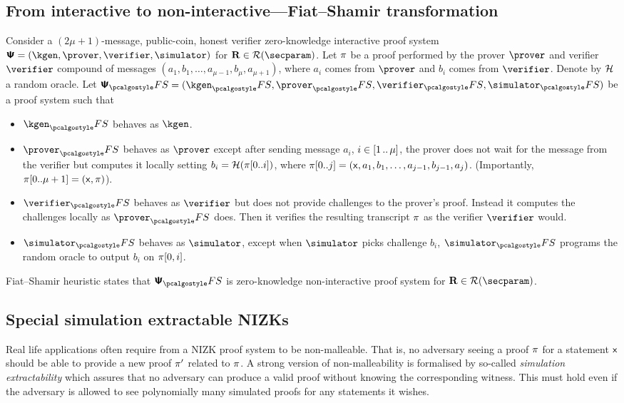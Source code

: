 \documentclass[runningheads,11pt]{llncs}
\begin{document}
\subsection{From interactive to non-interactive---Fiat--Shamir transformation}
Consider a $(2\mu + 1)$-message, public-coin, honest verifier zero-knowledge
interactive proof system
$\proofsystem = (\kgen, \prover, \verifier, \simulator)$ for
$\REL \in \RELGEN(\secparam)$.  Let $\pi$ be a proof performed by the
prover $\prover$ and verifier $\verifier$ compound of messages
$(a_1, b_1, \ldots, a_{\mu - 1}, b_{\mu}, a_{\mu + 1})$, where $a_i$ comes from
$\prover$ and $b_i$ comes from $\verifier$.  Denote by $\mathcal{H}$ a random oracle.
Let $\proofsystem_\fs = (\kgen_\fs, \prover_\fs, \verifier_\fs, \simulator_\fs)$
be a proof system such that
\begin{itemize}
  \item $\kgen_\fs$ behaves as $\kgen$.
  \item $\prover_\fs$ behaves as $\prover$ except after sending message
    $a_i$, $i \in [1 \, .. \, \mu]$, the prover does not wait for
    the message from the verifier but computes it locally setting $b_i
    = \mathcal{H}(\pi[0..i])$, where $\pi[0..j] = (\mathsf{x}, a_1, b_1, \ldots,
    a_{j - 1}, b_{j - 1}, a_j)$. (Importantly, $\pi[0..\mu + 1] =
    (\mathsf{x}, \pi)$).
  \item $\verifier_\fs$ behaves as $\verifier$ but does not provide
    challenges to the prover's proof. Instead it computes the
    challenges locally as $\prover_\fs$ does. Then it verifies the
    resulting transcript $\pi$ as the verifier $\verifier$ would. 
  \item $\simulator_\fs$ behaves as $\simulator$, except when
    $\simulator$ picks challenge $b_i$, $\simulator_\fs$ programs the
    random oracle to output $b_i$ on $\pi[0, i]$.
  \end{itemize}

Fiat--Shamir heuristic states that $\proofsystem_\fs$ is zero-knowledge
non-interactive proof system for $\REL \in \RELGEN(\secparam)$.

\subsection{Special simulation extractable NIZKs}
Real life applications often require from a NIZK proof system to be
non-malleable. That is, no adversary seeing a proof $\pi$ for a statement
$\mathsf{x}$ should be able to provide a new proof $\pi'$ related to $\pi$.
A strong version of non-malleability is formalised by so-called \emph{simulation extractability}
which assures that no adversary can produce a valid proof without knowing the
corresponding witness. This must hold even if the adversary is allowed to see
polynomially many simulated proofs for any statements it wishes.
\end{document}
